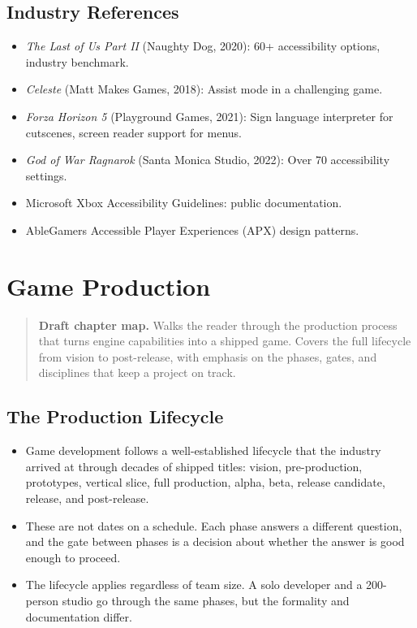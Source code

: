 \documentclass[
  11pt,
  letterpaper,
  DIV=11,
  numbers=noendperiod,
  twoside,
  open=right]{scrreprt}
\providecommand{\tightlist}{%
  \setlength{\itemsep}{0pt}\setlength{\parskip}{0pt}}
\begin{document}
\section{Industry References}\label{industry-references}

\begin{itemize}
\tightlist
\item
  \emph{The Last of Us Part II} (Naughty Dog, 2020): 60+ accessibility
  options, industry benchmark.
\item
  \emph{Celeste} (Matt Makes Games, 2018): Assist mode in a challenging
  game.
\item
  \emph{Forza Horizon 5} (Playground Games, 2021): Sign language
  interpreter for cutscenes, screen reader support for menus.
\item
  \emph{God of War Ragnarok} (Santa Monica Studio, 2022): Over 70
  accessibility settings.
\item
  Microsoft Xbox Accessibility Guidelines: public documentation.
\item
  AbleGamers Accessible Player Experiences (APX) design patterns.
\end{itemize}

\chapter{Game Production}\label{game-production}

\begin{quote}
\textbf{Draft chapter map.} Walks the reader through the production
process that turns engine capabilities into a shipped game. Covers the
full lifecycle from vision to post-release, with emphasis on the phases,
gates, and disciplines that keep a project on track.
\end{quote}

\section{The Production Lifecycle}\label{the-production-lifecycle}

\begin{itemize}
\tightlist
\item
  Game development follows a well-established lifecycle that the
  industry arrived at through decades of shipped titles: vision,
  pre-production, prototypes, vertical slice, full production, alpha,
  beta, release candidate, release, and post-release.
\item
  These are not dates on a schedule. Each phase answers a different
  question, and the gate between phases is a decision about whether the
  answer is good enough to proceed.
\item
  The lifecycle applies regardless of team size. A solo developer and a
  200-person studio go through the same phases, but the formality and
  documentation differ.
\end{itemize}
\end{document}
